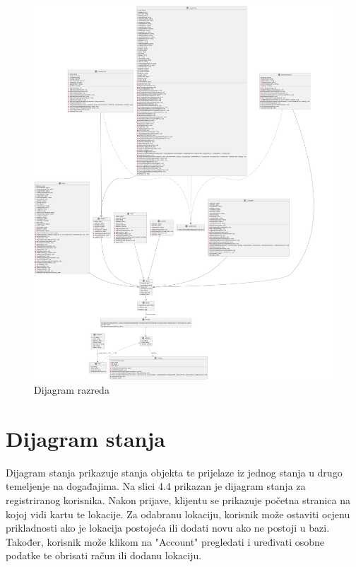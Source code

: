 	        \begin{figure}[H]
			\includegraphics[scale=0.2]{slike/DijagramRazreda.png}
			\centering
			\caption{Dijagram razreda}
			\label{fig:promjene}
		          \end{figure}
            
			\section{Dijagram stanja}

			Dijagram stanja prikazuje stanja objekta te prijelaze iz jednog stanja u drugo temeljenje na događajima. Na slici 4.4 prikazan je dijagram stanja za registriranog korisnika. Nakon prijave, klijentu se prikazuje početna stranica na kojoj vidi kartu te lokacije. Za odabranu lokaciju, korisnik može ostaviti ocjenu prikladnosti ako je lokacija postojeća ili dodati novu ako ne postoji u bazi. Također, korisnik može klikom na "Account" pregledati i uređivati osobne podatke te obrisati račun ili dodanu lokaciju. 

